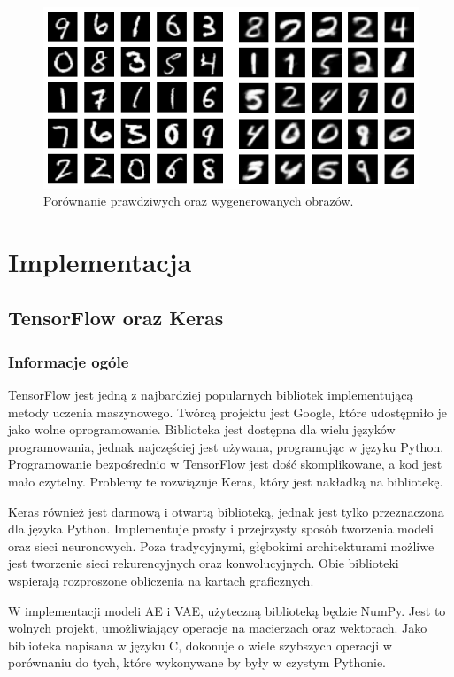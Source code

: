 \documentclass[a4paper,12pt,oneside]{book} %
\begin{document}
\begin{figure}[h!]
	\centering
	\includegraphics[width=12cm]{vaegeneracja.png}
	\caption{Porównanie prawdziwych oraz wygenerowanych obrazów.}
	\label{fig:vaegeneracja}
\end{figure}


\chapter{Implementacja}
\section{TensorFlow oraz Keras}
\subsection{Informacje ogóle}
TensorFlow jest jedną z najbardziej popularnych bibliotek implementującą metody uczenia maszynowego. Twórcą projektu jest Google, które udostępniło je jako wolne oprogramowanie. Biblioteka jest dostępna dla wielu języków programowania, jednak najczęściej jest używana, programując w języku Python. Programowanie bezpośrednio w TensorFlow jest dość skomplikowane, a kod jest mało czytelny. Problemy te rozwiązuje Keras, który jest nakładką na bibliotekę. 

Keras również jest darmową i otwartą biblioteką, jednak jest tylko przeznaczona dla języka Python. Implementuje prosty i przejrzysty sposób tworzenia modeli oraz sieci neuronowych. Poza tradycyjnymi, głębokimi architekturami możliwe jest tworzenie sieci rekurencyjnych oraz konwolucyjnych. Obie biblioteki wspierają rozproszone obliczenia na kartach graficznych. 

W implementacji modeli AE i VAE, użyteczną biblioteką będzie NumPy. Jest to wolnych projekt, umożliwiający operacje na macierzach oraz wektorach. Jako biblioteka napisana w języku C, dokonuje o wiele szybszych operacji w porównaniu do tych, które wykonywane by były w czystym Pythonie. 
\end{document}

